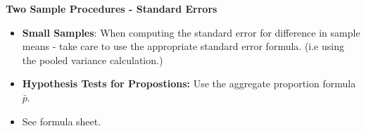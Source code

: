 \noindent \textbf{Two Sample Procedures - Standard Errors}
\begin{itemize}
\item \textbf{Small Samples}: When computing the standard error for difference in sample means - take care to use the appropriate standard error formula. (i.e using the pooled variance calculation.)
\item \textbf{Hypothesis Tests for Propostions:} Use the aggregate proportion formula $\bar{p}$.
\item See formula sheet.
\end{itemize}



